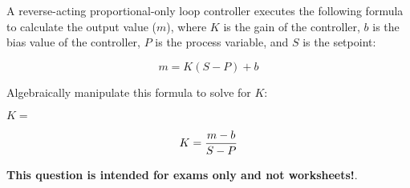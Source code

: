 

A reverse-acting proportional-only loop controller executes the following formula to calculate the output value ($m$), where $K$ is the gain of the controller, $b$ is the bias value of the controller, $P$ is the process variable, and $S$ is the setpoint:

$$m = K(S - P) + b$$

Algebraically manipulate this formula to solve for $K$:

\vskip 20pt

$K = $







$$K = {m - b \over S - P}$$







{\bf This question is intended for exams only and not worksheets!}.



